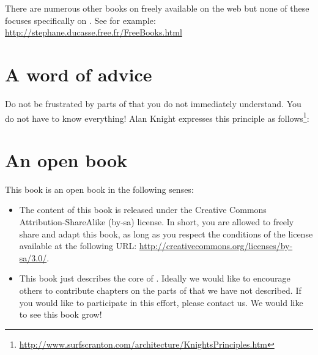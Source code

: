 \documentclass[a4paper,10pt,twoside]{book}
\begin{document}
There are numerous other books on \st freely available on the web but none of these focuses specifically on \pharo. See for example:
\url{http://stephane.ducasse.free.fr/FreeBooks.html}

\ifluluelse{}{\newpage} %
\section*{A word of advice}


Do not be frustrated by parts of \st that you do not immediately understand.
You do not have to know everything!
Alan Knight expresses this principle as follows\footnote{\url{http://www.surfscranton.com/architecture/KnightsPrinciples.htm}}:

\section*{An open book}

This book is an open book in the following senses: 

\begin{itemize}

\item	The content of this book is released under the Creative Commons Attribution-ShareAlike (by-sa) license.
		In short, you are allowed to freely share and adapt this book, as long as you respect the conditions of the license available at the following URL: 
		\url{http://creativecommons.org/licenses/by-sa/3.0/}.

\item	This book just describes the core of \pharo.
		Ideally we would like to encourage others to contribute chapters
		on the parts of \pharo that we have not described.
		If you would like to participate in this effort, please
		contact us.  We would like to see this book grow!
\end{itemize}
\end{document}

